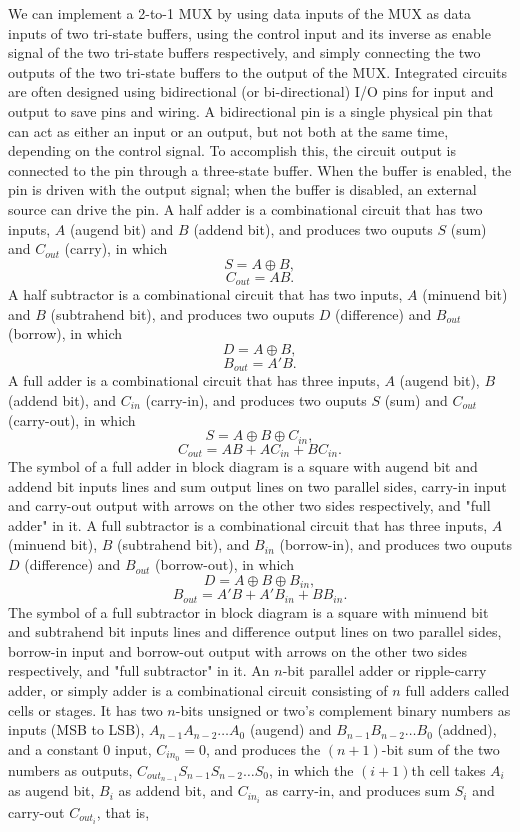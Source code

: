 \documentclass[a4paper,12pt]{article}
\begin{document}
\begin{itemize}
\begin{itemize}
\begin{itemize}
\begin{itemize}
\begin{itemize}
\begin{itemize}
\begin{itemize}
We can implement a 2-to-1 MUX by using data inputs of the MUX as data inputs of two tri-state buffers, using the control input and its inverse as enable signal of the two tri-state buffers respectively, and simply connecting the two outputs of the two tri-state buffers to the output of the MUX.
Integrated circuits are often designed using bidirectional (or bi-directional) I/O pins for input and output to save pins and wiring. A bidirectional pin is a single physical pin that can act as either an input or an output, but not both at the same time, depending on the control signal. To accomplish this, the circuit output is connected to the pin through a three-state buffer. When the buffer is enabled, the pin is driven with the output signal; when the buffer is disabled, an external source can drive the pin.
A half adder is a combinational circuit that has two inputs, $A$ (augend bit) and $B$ (addend bit), and produces two ouputs $S$ (sum) and $C_{out}$ (carry), in which
\[S=A\oplus B,\]
\[C_{out}=AB.\]
A half subtractor is a combinational circuit that has two inputs, $A$ (minuend bit) and $B$ (subtrahend bit), and produces two ouputs $D$ (difference) and $B_{out}$ (borrow), in which
\[D=A\oplus B,\]
\[B_{out}=A'B.\]
A full adder is a combinational circuit that has three inputs, $A$ (augend bit), $B$ (addend bit), and $C_{in}$ (carry-in), and produces two ouputs $S$ (sum) and $C_{out}$ (carry-out), in which
\[S=A\oplus B\oplus C_{in},\]
\[C_{out}=AB+AC_{in}+BC_{in}.\]
The symbol of a full adder in block diagram is a square with augend bit and addend bit inputs lines and sum output lines on two parallel sides, carry-in input and carry-out output with arrows on the other two sides respectively, and "full adder" in it.
A full subtractor is a combinational circuit that has three inputs, $A$ (minuend bit), $B$ (subtrahend bit), and $B_{in}$ (borrow-in), and produces two ouputs $D$ (difference) and $B_{out}$ (borrow-out), in which
\[D=A\oplus B\oplus B_{in},\]
\[B_{out}=A'B+A'B_{in}+BB_{in}.\]
The symbol of a full subtractor in block diagram is a square with minuend bit and subtrahend bit inputs lines and difference output lines on two parallel sides, borrow-in input and borrow-out output with arrows on the other two sides respectively, and "full subtractor" in it.
An $n$-bit parallel adder or ripple-carry adder, or simply adder is a combinational circuit consisting of $n$ full adders called cells or stages. It has two $n$-bits unsigned or two's complement binary numbers as inputs (MSB to LSB), $A_{n-1}A_{n-2}\ldots A_0$ (augend) and $B_{n-1}B_{n-2}\ldots B_0$ (addned), and a constant $0$ input, $C_{in_0}=0$, and produces the $(n+1)$-bit sum of the two numbers as outputs, $C_{out_{n-1}}S_{n-1}S_{n-2}\ldots S_0$, in which the $(i+1)$th cell takes $A_i$ as augend bit, $B_i$ as addend bit, and $C_{in_i}$ as carry-in, and produces sum $S_i$ and carry-out $C_{out_i}$, that is,

\end{itemize}
\end{itemize}
\end{itemize}
\end{itemize}
\end{itemize}
\end{itemize}
\end{itemize}
\end{document}
